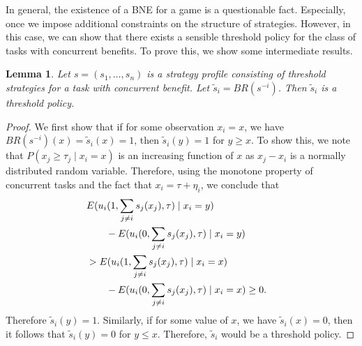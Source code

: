 \documentclass[conference]{ieeeconf}
\newtheorem{lemma}{Lemma}
\begin{document}
In general, the existence of a BNE for a game is a questionable fact. Especially, once we impose additional constraints on the structure of strategies. However, in this case, we can show that there exists a sensible threshold policy for the class of tasks with concurrent benefits. To prove this, we show some intermediate results. 
\begin{lemma}\label{lemma:thresholdBR}
Let $s=(s_1,\ldots,s_n)$ is a strategy profile consisting of threshold strategies for a task with concurrent benefit. Let $\tilde{s}_i=BR(s^{-i})$. Then $\tilde{s}_i$ is a threshold policy. 
\end{lemma}
\begin{proof}
We first show that if for some observation $x_i=x$, we have $BR(s^{-i})(x)=\tilde{s}_i(x)=1$, then $\tilde{s}_i(y)=1$ for $y\geq x$. To show this,  we note that $P(x_j\geq \tau_j\mid x_i=x)$ is an increasing function of $x$ as $x_j-x_i$ is a normally distributed random variable. Therefore, using the monotone property of concurrent tasks and the fact that $x_i=\tau+\eta_i$, we conclude that 
\begin{align}
&E(u_i(1,\sum_{j\not=i}s_j(x_j),\tau)\mid x_i=y)\cr 
&\qquad-E(u_i(0,\sum_{j\not=i}s_j(x_j),\tau)\mid x_i=y)\cr 
&>E(u_i(1,\sum_{j\not=i}s_j(x_j),\tau)\mid x_i=x)\cr
&\qquad-E(u_i(0,\sum_{j\not=i}s_j(x_j),\tau)\mid x_i=x)\geq 0.
\end{align}
Therefore $\tilde{s}_i(y)=1$. Similarly, if for some value of $x$, we have $\tilde{s}_i(x)=0$, then it follows that $\tilde{s}_i(y)=0$ for $y\leq x$. Therefore, $\tilde{s}_i$ would be a threshold policy.  
\end{proof}
\end{document}
